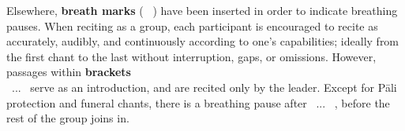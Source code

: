 \ifninebythirteen\clearpage\fi

Elsewhere, \textbf{breath marks} ( \abbrbreathmark\ ) have been inserted in order to indicate breathing pauses. When reciting as a group, each participant is encouraged to recite as accurately, audibly, and continuously according to one's capabilities; ideally from the first chant to the last without interruption, gaps, or omissions. However, passages within \textbf{brackets} \ifninebythirteen \\ \fi \anglebracketleft\ \hspace{-0.5mm}... \hspace{-0.8mm}\anglebracketright\ serve as an introduction, and are recited only by the leader. Except for Pāli protection and funeral chants, there is a breathing pause after \anglebracketleft\ \hspace{-0.5mm}... \hspace{-0.8mm}\anglebracketright\ , before the rest of the group joins in.

\clearpage

